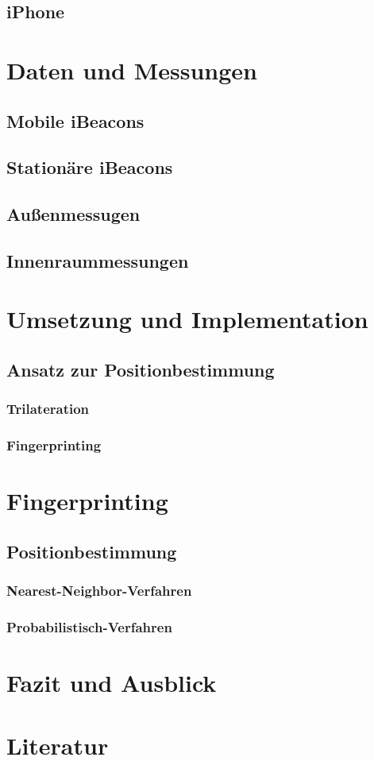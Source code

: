 \documentclass[liststotoc,a4paper, 12pt]{scrartcl}
\begin{document}
\subsection{iPhone}

\section{Daten und Messungen}
\subsection{Mobile iBeacons}
\subsection{Stationäre iBeacons}
\subsection{Außenmessugen}
\subsection{Innenraummessungen}

\section{Umsetzung und Implementation}

\subsection{Ansatz zur Positionbestimmung}
\subsubsection{Trilateration}
\subsubsection{Fingerprinting}

\section{Fingerprinting}
\subsection{Positionbestimmung}
\subsubsection{Nearest-Neighbor-Verfahren}
\subsubsection{Probabilistisch-Verfahren}

\section{Fazit und Ausblick}

\section{Literatur}
\end{document}
